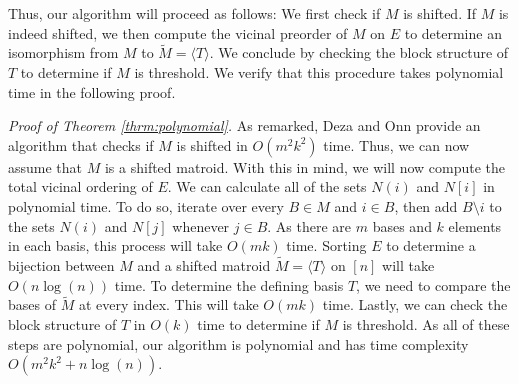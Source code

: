 \documentclass[10pt,a4paper]{amsart}
\makeatletter
\let\laneX@cite\cite
\renewcommand{\cite}{\protect\laneX@citenew}
\newcommand{\laneX@citenew}{\@ifnextchar[{\laneX@cite@a}{\laneX@cite@b}}
\def\laneX@cite@b#1{\laneX@cite{#1}}
\def\laneX@cite@a[#1]{\@ifnextchar[{\laneX@cite@c{#1}}{\laneX@cite@d{#1}}}
\def\laneX@cite@d#1#2{\laneX@cite[#1]{#2}}
\def\laneX@cite@c#1[#2]#3{[\unskip #1 \csname b@#3\endcsname, #2]}
\theoremstyle{definition}
\theoremstyle{plain}
\makeatother
\begin{document}
Thus, our algorithm will proceed as follows:
We first check if $M$ is shifted. If $M$ is indeed shifted, we then compute the vicinal preorder of $M$ on $E$ to determine an isomorphism from $M$ to $\tilde M=\langle T \rangle$. We conclude by checking the block structure of $T$ to determine if $M$ is threshold. We verify that this procedure takes polynomial time in the following proof.

\vspace{1em}

\noindent \emph{Proof of Theorem \ref{thrm:polynomial}.} As remarked, Deza and Onn \cite[Section $8$]{DO} provide an algorithm that checks if $M$ is shifted in $O(m^2k^2)$ time. Thus, we can now assume that $M$ is a shifted matroid. With this in mind, we will now compute the total vicinal ordering of $E$. We can calculate all of the sets $N(i)$ and $N[i]$ in polynomial time. To do so, iterate over every $B\in M$ and $i\in B$, then add $B\setminus i$ to the sets $N(i)$ and $N[j]$ whenever $j\in B$. As there are $m$ bases and $k$ elements in each basis, this process will take $O(mk)$ time. Sorting $E$ to determine a bijection between $M$ and a shifted matroid $\tilde M= \langle T \rangle$ on $[n]$ will take $O(n\log(n))$ time. To determine the defining basis $T$, we need to compare the bases of $\tilde M$ at every index. This will take $O(mk)$ time. Lastly, we can check the block structure of $T$ in $O(k)$ time to determine if $M$ is threshold. As all of these steps are polynomial, our algorithm is polynomial and has time complexity $O(m^{2}k^{2}+n\log(n))$.
\end{document}
